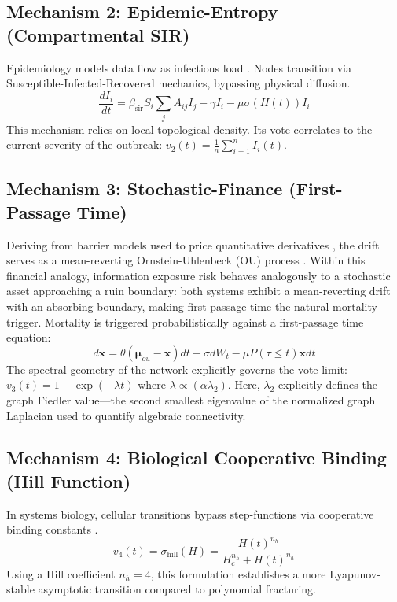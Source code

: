 \documentclass[review,12pt]{elsarticle}
\begin{document}
\subsection{Mechanism 2: Epidemic-Entropy (Compartmental SIR)}
Epidemiology models data flow as infectious load \cite{pastor2015epidemic}. Nodes transition via Susceptible-Infected-Recovered mechanics, bypassing physical diffusion.
\begin{equation}
    \frac{dI_i}{dt} = \beta_{\text{sir}} S_i \sum_{j} A_{ij} I_j - \gamma I_i - \mu \sigma(H(t)) I_i
\end{equation}
This mechanism relies on local topological density. Its vote correlates to the current severity of the outbreak: $v_2(t) = \frac{1}{n}\sum_{i=1}^n I_i(t)$.

\subsection{Mechanism 3: Stochastic-Finance (First-Passage Time)}
Deriving from barrier models used to price quantitative derivatives \cite{black1973pricing}, the drift serves as a mean-reverting Ornstein-Uhlenbeck (OU) process \cite{uhlenbeck1930theory}. Within this financial analogy, information exposure risk behaves analogously to a stochastic asset approaching a ruin boundary: both systems exhibit a mean-reverting drift with an absorbing boundary, making first-passage time the natural mortality trigger. Mortality is triggered probabilistically against a first-passage time equation:
\begin{equation}
    d\mathbf{x} = \theta (\mathbf{\mu}_{ou} - \mathbf{x})dt + \sigma dW_t - \mu P(\tau \le t) \mathbf{x} dt
\end{equation}
The spectral geometry of the network explicitly governs the vote limit: $v_3(t) = 1 - \exp(-\lambda t)$ where $\lambda \propto (\alpha \lambda_2)$. Here, $\lambda_2$ explicitly defines the graph Fiedler value—the second smallest eigenvalue of the normalized graph Laplacian used to quantify algebraic connectivity.

\subsection{Mechanism 4: Biological Cooperative Binding (Hill Function)}
In systems biology, cellular transitions bypass step-functions via cooperative binding constants \cite{alon2019introduction}.
\begin{equation}
    v_4(t) = \sigma_{\text{hill}}(H) = \frac{H(t)^{n_h}}{H_c^{n_h} + H(t)^{n_h}}
\end{equation}
Using a Hill coefficient $n_h=4$, this formulation establishes a more Lyapunov-stable asymptotic transition compared to polynomial fracturing.
\end{document}
